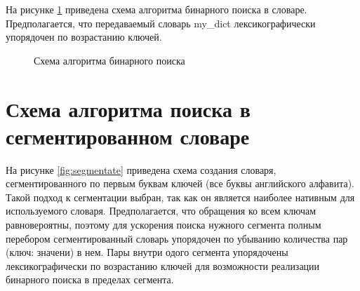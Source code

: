 На рисунке \ref{fig:binary_search} приведена схема алгоритма бинарного поиска в словаре. Предполагается, что передаваемый словарь my\_dict лексикографически упорядочен по возрастанию ключей.

\begin{figure}[h!]
	
	
	\caption{Схема алгоритма бинарного поиска}
	
	\label{fig:binary_search}
	
\end{figure}

\clearpage
\section{Схема алгоритма поиска в сегментированном словаре}

На рисунке \ref{fig:segmentate} приведена схема создания словаря, сегментированного по первым буквам ключей (все буквы английского алфавита). Такой подход к сегментации выбран, так как он является наиболее нативным для используемого словаря. Предполагается, что обращения ко всем ключам равновероятны, поэтому для ускорения поиска нужного сегмента полным перебором сегментированный словарь упорядочен по убыванию количества пар (ключ: значени) в нем. Пары внутри одого сегмента упорядочены лексикографически по возрастанию ключей для возможности реализации бинарного поиска в пределах сегмента.


